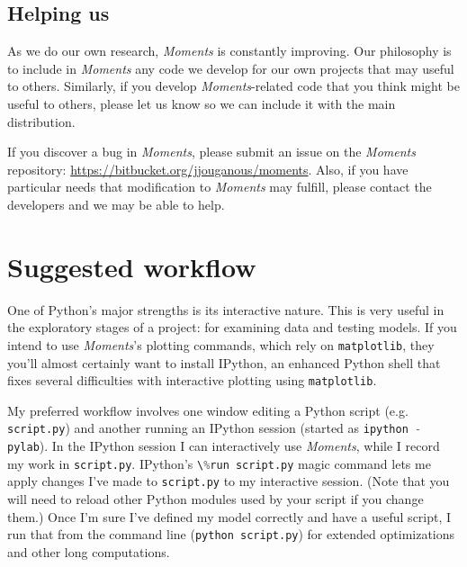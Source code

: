 \documentclass[12pt]{article}
\makeatletter
\newcommand{\dadi}{$\partial$a$\partial$i\xspace}
\newcommand{\py}[1]{\lstinline[breaklines=true,language=Python, showstringspaces=False]@#1@}
\makeatother
\begin{document}

\subsection{Helping us}

As we do our own research, \textit{Moments} is constantly improving.
Our philosophy is to include in \textit{Moments} any code we develop for our own projects that may useful to others.
Similarly, if you develop \textit{Moments}-related code that you think might be useful to others, please let us know so we can include it with the main distribution.

If you discover a bug in \textit{Moments}, please submit an issue on the \textit{Moments} repository: \url{https://bitbucket.org/jjouganous/moments}.
Also, if you have particular needs that modification to \textit{Moments} may fulfill, please contact the developers and we may be able to help.

\section{Suggested workflow}

One of Python's major strengths is its interactive nature.
This is very useful in the exploratory stages of a project: for examining data and testing models.
If you intend to use \textit{Moments}'s plotting commands, which rely on \py{matplotlib}, they you'll almost certainly want to install IPython, an enhanced Python shell that fixes several difficulties with interactive plotting using \py{matplotlib}.

My preferred workflow involves one window editing a Python script (e.g. \py{script.py}) and another running an IPython session (started as \py{ipython -pylab}).
In the IPython session I can interactively use \textit{Moments}, while I record my work in \py{script.py}.
IPython's \py{\%run script.py} magic command lets me apply changes I've made to \py{script.py} to my interactive session. 
(Note that you will need to reload other Python modules used by your script if you change them.)
Once I'm sure I've defined my model correctly and have a useful script, I run that from the command line (\py{python script.py}) for extended optimizations and other long computations.
\end{document}
